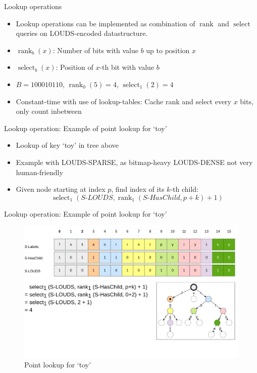 \documentclass{beamer}
\begin{document}
\begin{frame}{Lookup operations}
		\begin{itemize}
				\item Lookup operations can be implemented as combination of
						$\operatorname{rank}$ and $\operatorname{select}$
						queries on LOUDS-encoded datastructure.
				\item $\operatorname{rank}_b(x)$: Number of bits with value $b$
						up to position $x$
				\item $\operatorname{select}_b(x)$: Position of $x$-th bit with value $b$
				\item $B = 100010110$, $\operatorname{rank}_0(5) = 4$,
						$\operatorname{select}_1(2) = 4$
				\item Constant-time with use of lookup-tables: Cache rank and
						select every $x$ bits, only count inbetween
		\end{itemize}
\end{frame}

\begin{frame}{Lookup operation: Example of point lookup for `toy'}
		\begin{itemize}
				\item Lookup of key `toy' in tree above
				\item Example with LOUDS-SPARSE, as bitmap-heavy LOUDS-DENSE not
						very human-friendly
				\item Given node starting at index $p$, find index of its $k$-th child:
						\[
								\operatorname{select}_1(S\text{-}LOUDS, \operatorname{rank}_1(S\text{-}HasChild, p+k) + 1)
						\]
		\end{itemize}
\end{frame}

\begin{frame}{Lookup operation: Example of point lookup for `toy'}
		\begin{figure}
				\centering
				\includegraphics[width=\textwidth]{resources/surf_point_lookup_1}
				\caption{Point lookup for `toy'}
		\end{figure}
\end{frame}
\end{document}
